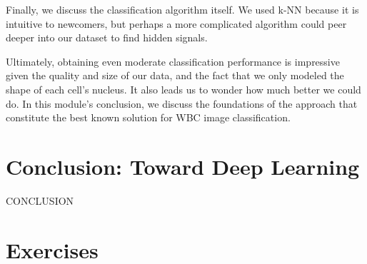 \begin{qbox}\end{qbox}

Finally, we discuss the classification algorithm itself. We used k-NN because it is intuitive to newcomers, but perhaps a more complicated algorithm could peer deeper into our dataset to find hidden signals.

Ultimately, obtaining even moderate classification performance is impressive given the quality and size of our data, and the fact that we only modeled the shape of each cell's nucleus. It also leads us to wonder how much better we could do. In this module's conclusion, we discuss the foundations of the approach that constitute the best known solution for WBC image classification.\\

\FloatBarrier
{}
\section{Conclusion: Toward Deep Learning}
\label{sec:conclusion}

CONCLUSION

\FloatBarrier

\newpage
\section{Exercises}
\label{sec:exercises}

\begin{exercise}[%
The iris flower dataset has four features. Apply PCA to produce the iris flower dataset with dimension $d = 2$.
]\end{exercise}
